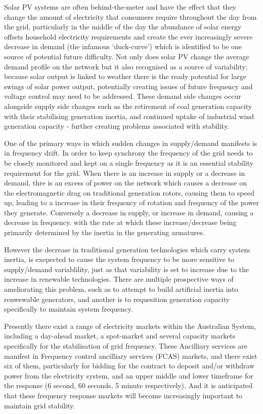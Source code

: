 Solar PV systems are often behind-the-meter and have the effect that they change the amount of electricity that consumers require throughout the day from the grid, particularly in the middle of the day the abundance of solar energy offsets household electricity requirements and create the ever increasingly severe decrease in demand (the infamous `duck-curve') which is identified to be one source of potential future difficulty.
Not only does solar PV change the average demand profile on the network but it also recognised as a source of variability; because solar output is linked to weather there is the ready potential for large swings of solar power output, potentially creating issues of future frequency and voltage control may need to be addressed.\cite{australianenergymarketoperatorlimited2018}
These demand side changes occur alongside supply side changes such as the retirement of coal generation capacity with their stabilising generation inertia, and continued uptake of industrial wind generation capacity - further creating problems associated with stability.

One of the primary ways in which sudden changes in supply/demand manifests is in frequency drift.
In order to keep synchrony the frequency of the grid needs to be closely monitored and kept on a single frequency as it is an essential stability requirement for the grid.
When there is an increase in supply or a decrease in demand, thre is an excess of power on the network which causes a decrease on the electromagnetic drag on traditional generation rotors, causing them to speed up, leading to a increase in their frequency of rotation and frequency of the power they generate.
Conversely a decrease in supply, or increase in demand, causing a decrease in frequency. with the rate at which these increase/decrease being primarily determined by the inertia in the generating armatures.

However the decrease in traditional generation technologies which carry system inertia, is exepected to cause the system frequency to be more sensitive to supply/demand variablility, just as that variability is set to increase due to the increase in renewable technologies.
There are multiple prospective ways of ameliorating this problem, such as to attempt to build artificial inertia into renwewable generators, and another is to requesition generation capacity specifically to maintain system frequency.\cite{doi:10.1002/2050-7038.12128}

Presently there exist a range of electricity markets within the Australian System, including a day-ahead market, a spot-market and several capacity markets specifically for the stabilisation of grid frequency.
These Ancilliary services are manifest in Frequency control ancilliary services (FCAS) markets, and there exist six of them, particularly for bidding for the contract to deposit and/or withdraw power from the electricity system, and an upper middle and lower timeframe for the response (6 second, 60 seconds, 5 minute respectively). \cite{RIESZ201586}
And it is anticipated that these frequency response markets will become increasingly important to maintain grid stability.

